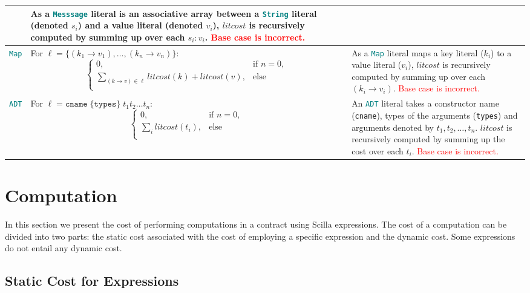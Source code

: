 \documentclass[9pt]{article}
\begin{document}
\begin{table}[!hbt]
\begin{tabular}{|c|p{6.7cm}|p{6cm}|}
$$		$$ & As a \texttt{\textcolor{teal}{Messsage}} literal is an associative array
		between a  \texttt{\textcolor{teal}{String}} literal (denoted $s_i$) and a
		value literal (denoted $v_i$), $litcost$
		is recursively computed by summing up over each $s_i : v_i$.
		\textcolor{red}{Base case is incorrect.}   \\ \hline
		\texttt{\textcolor{teal}{Map}} &
		For $\ell = \{(k_1 \rightarrow v_1), 
		\ldots, (k_n \rightarrow v_n)\}$:
		$$ \begin{cases}
    		0, & \text{if } n = 0,  \\
  			\sum_{(k \rightarrow v) \in \ell} {litcost(k) + litcost(v)},  &
    		\text{else } \\
  \end{cases}
		$$ & As a \texttt{\textcolor{teal}{Map}} literal maps a key literal ($k_i$) to a
		value literal ($v_i$),  $litcost$
		is recursively computed by summing up over each $(k_i \rightarrow v_i)$. \textcolor{red}{Base case is incorrect.} \\ \hline
		\texttt{\textcolor{teal}{ADT}} & For $\ell = \texttt{cname}\;
		\{\texttt{types}\} \; t_1 t_2 \ldots t_n $:
		$$ \begin{cases}
    		0, & \text{if } n = 0,  \\
  			\sum_{i} {litcost(t_i)},  &
    		\text{else } \\
  		\end{cases}
		$$ 
		
		& An \texttt{\textcolor{teal}{ADT}} literal takes a constructor name
		(\texttt{cname}), types of the arguments (\texttt{types}) and arguments
		denoted by $t_1, t_2, \ldots, t_n$. $litcost$ is recursively computed
		by summing up the cost over each $t_i$. \textcolor{red}{Base case is incorrect.} \\ \hline
	\end{tabular}
	\end{table}
 
\section{Computation}

In this section we present the cost of performing computations in a contract
using Scilla expressions. The cost of a computation can be divided into two
parts: the static cost associated with the cost of employing a specific
expression and the dynamic cost. Some expressions do not entail any dynamic
cost.

\subsection{Static Cost for Expressions}
\end{document}

